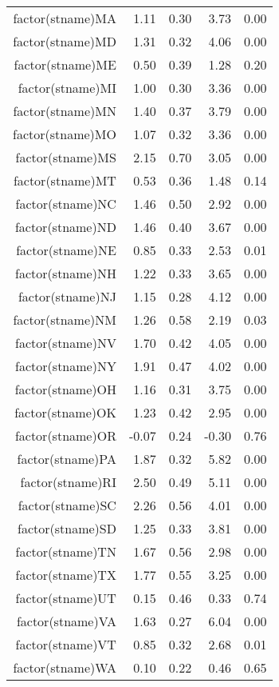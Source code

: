 \begin{table}[ht]
\begin{tabular}{rrrrr}
  factor(stname)MA & 1.11 & 0.30 & 3.73 & 0.00 \\ 
  factor(stname)MD & 1.31 & 0.32 & 4.06 & 0.00 \\ 
  factor(stname)ME & 0.50 & 0.39 & 1.28 & 0.20 \\ 
  factor(stname)MI & 1.00 & 0.30 & 3.36 & 0.00 \\ 
  factor(stname)MN & 1.40 & 0.37 & 3.79 & 0.00 \\ 
  factor(stname)MO & 1.07 & 0.32 & 3.36 & 0.00 \\ 
  factor(stname)MS & 2.15 & 0.70 & 3.05 & 0.00 \\ 
  factor(stname)MT & 0.53 & 0.36 & 1.48 & 0.14 \\ 
  factor(stname)NC & 1.46 & 0.50 & 2.92 & 0.00 \\ 
  factor(stname)ND & 1.46 & 0.40 & 3.67 & 0.00 \\ 
  factor(stname)NE & 0.85 & 0.33 & 2.53 & 0.01 \\ 
  factor(stname)NH & 1.22 & 0.33 & 3.65 & 0.00 \\ 
  factor(stname)NJ & 1.15 & 0.28 & 4.12 & 0.00 \\ 
  factor(stname)NM & 1.26 & 0.58 & 2.19 & 0.03 \\ 
  factor(stname)NV & 1.70 & 0.42 & 4.05 & 0.00 \\ 
  factor(stname)NY & 1.91 & 0.47 & 4.02 & 0.00 \\ 
  factor(stname)OH & 1.16 & 0.31 & 3.75 & 0.00 \\ 
  factor(stname)OK & 1.23 & 0.42 & 2.95 & 0.00 \\ 
  factor(stname)OR & -0.07 & 0.24 & -0.30 & 0.76 \\ 
  factor(stname)PA & 1.87 & 0.32 & 5.82 & 0.00 \\ 
  factor(stname)RI & 2.50 & 0.49 & 5.11 & 0.00 \\ 
  factor(stname)SC & 2.26 & 0.56 & 4.01 & 0.00 \\ 
  factor(stname)SD & 1.25 & 0.33 & 3.81 & 0.00 \\ 
  factor(stname)TN & 1.67 & 0.56 & 2.98 & 0.00 \\ 
  factor(stname)TX & 1.77 & 0.55 & 3.25 & 0.00 \\ 
  factor(stname)UT & 0.15 & 0.46 & 0.33 & 0.74 \\ 
  factor(stname)VA & 1.63 & 0.27 & 6.04 & 0.00 \\ 
  factor(stname)VT & 0.85 & 0.32 & 2.68 & 0.01 \\ 
  factor(stname)WA & 0.10 & 0.22 & 0.46 & 0.65 \\ 

\end{tabular}
\end{table}
